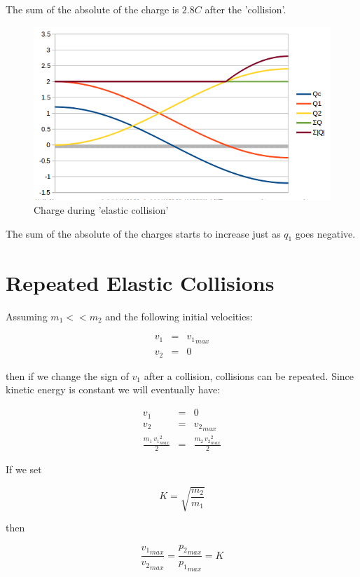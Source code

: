 \documentclass[]{../common/elementary-physics}
\begin{document}
The sum of the absolute of the charge is $2.8 C$ after the 'collision'.

\begin{figure}[ht] \centering
	\includegraphics[scale=.5]{cclg} \caption{Charge during 'elastic collision'}
\end{figure}

The sum of the absolute of the charges starts to increase just as $q_1$ goes negative.

\section{Repeated Elastic Collisions}

Assuming $m_1<<m_2$ and the following initial velocities:

\begin{eqnarray}
v_1 &=& {v_1}_{max} \\
v_2 &=& 0
\end{eqnarray}

then if we change the sign of $v_1$ after a collision, collisions can be repeated.
Since kinetic energy is constant we will eventually have:

\begin{eqnarray}
v_1 &=& 0 \\
v_2 &=& {v_2}_{max} \\
\frac{m_1 \, {v_1}_{max}^2}{2} &=& \frac{m_2 \, {v_2}_{max}^2}{2}
\end{eqnarray}

If we set

\begin{equation}
K = \sqrt{\frac{m_2}{m_1}}
\end{equation}

then

\begin{equation}
\frac{{v_1}_{max}}{{v_2}_{max}} = \frac{{p_2}_{max}}{{p_1}_{max}} = K
\end{equation}
\end{document}
